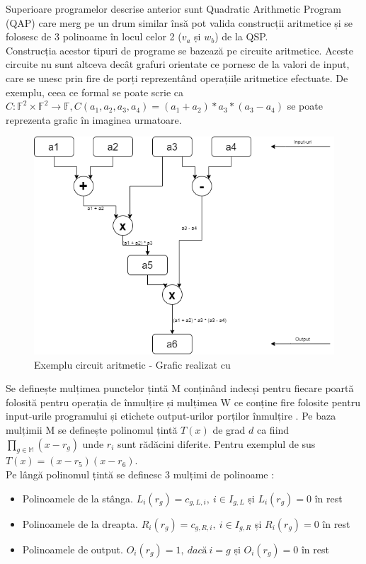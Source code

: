 Superioare programelor descrise anterior sunt Quadratic Arithmetic Program (QAP) care merg pe un drum similar însă pot valida construcții aritmetice și se folosesc de 3 polinoame în locul celor 2 ($v_a$ și $w_b$) de la QSP.\\

Construcția acestor tipuri de programe se bazează pe circuite aritmetice. Aceste circuite nu sunt altceva decât grafuri orientate ce pornesc de la valori de input, care se unesc prin fire de porți reprezentând operațiile aritmetice efectuate. De exemplu, ceea ce formal se poate scrie ca $C: \mathbb{F}^2 \times \mathbb{F}^2 \rightarrow \mathbb{F}, C(a_1,a_2,a_3,a_4) = (a_1 + a_2) * a_3 * (a_3 - a_4)$ se poate reprezenta grafic în imaginea urmatoare.\\

\begin{figure}[H]
\centering
\includegraphics[scale=0.6]{Images/ZKS_QAP_Example.png}
\caption{Exemplu circuit aritmetic - Grafic realizat cu \cite{Diagrams}}
\end{figure}

Se definește mulțimea punctelor țintă M conținând indecși pentru fiecare poartă folosită pentru operația de înmulțire și mulțimea W ce conține fire folosite pentru input-urile programului și etichete output-urilor porților înmulțire \cite{ZKS_Crypto_Basic4}. Pe baza mulțimii M se definește polinomul țintă $T(x)$ de grad $d$ ca fiind $\prod_{g\in\mathbb{M}} (x - r_g)$ unde $r_i$ sunt rădăcini diferite. Pentru exemplul de sus $T(x) = (x-r_5)(x-r_6)$.\\

Pe lângă polinomul țintă se definesc 3 mulțimi de polinoame \cite{ZKS_Crypto_Basic3}:
\begin{itemize}
    \item Polinoamele de la stânga. $L_i(r_g) = c_{g,L,i},\ i \in I_{g,L}$ și $L_i(r_g) = 0$ în rest
    \item Polinoamele de la dreapta. $R_i(r_g) = c_{g,R,i},\ i \in I_{g,R}$ și $R_i(r_g) = 0$ în rest
    \item Polinoamele de output. $O_i(r_g) = 1,\ dacă\ i = g$ și $O_i(r_g) = 0$ în rest
\end{itemize}

